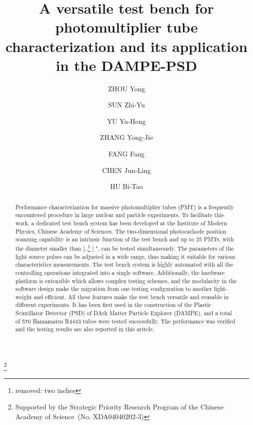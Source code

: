 \documentclass{nst}
\providecommand{\DIFadd}[1]{{\protect\color{blue} \sf #1}} %
\providecommand{\DIFdel}[1]{{\protect\color{red} [..\footnote{removed: #1} ]}} %
\providecommand{\DIFaddbegin}{} %
\providecommand{\DIFaddend}{} %
\providecommand{\DIFdelbegin}{} %
\providecommand{\DIFdelend}{} %
\begin{document}
\title{A versatile test bench for photomultiplier tube characterization and its application in the DAMPE-PSD}\thanks{Supported by the Strategic Priority Research Program of the Chinese Academy of Science~(No. XDA04040202-3)}

\author[周勇]{ZHOU Yong}
\author[孙志宇]{SUN Zhi-Yu}
\author[余玉洪]{YU Yu-Hong}
\author[张永杰]{ZHANG Yong-Jie}
\author[方芳]{FANG Fang}
\author[陈俊岭]{CHEN Jun-Ling}
\author[胡碧涛]{HU Bi-Tao}


\begin{abstract}
 Performance characterization for massive photomultiplier tubes (PMT) is a frequently encountered procedure in large nuclear and particle experiments. To facilitate this work, a dedicated test bench system has been developed at the Institute of Modern Physics, Chinese Academy of Sciences.
 The two-dimensional photocathode position scanning capability is an intrinsic function of the test bench and up to 25 PMTs, with the diameter smaller than \DIFdelbegin \DIFdel{two inches}\DIFdelend \DIFaddbegin \DIFadd{2"}\DIFaddend , can be tested simultaneously.
 The parameters of the light source pulses can be adjusted in a wide range, thus making it suitable for various characteristics measurements.
 The test bench system is highly automated with all the controlling operations integrated into a single software. 
 Additionally, the hardware platform is extensible which allows complex testing schemes, and the modularity in the software design make the migration from one testing configuration to another light-weight and efficient.
 All these features make the test bench versatile and reusable in different experiments.
 It has been first used in the construction of the Plastic Scintillator Detector (PSD) of DArk Matter Particle Explorer (DAMPE), and a total of 570 Hamamatsu R4443 tubes were tested successfully. The performance was verified and the testing results are also reported in this aritcle.
\end{abstract}
\end{document}
